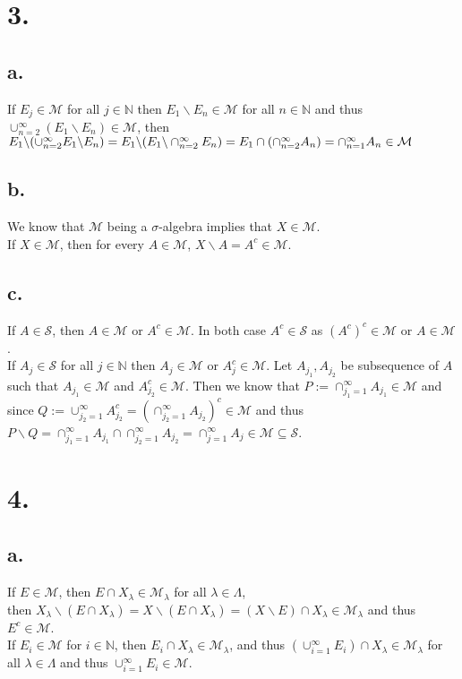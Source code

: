 \documentclass[11pt]{article}
\theoremstyle{mystyle}
\theoremstyle{definition}
\begin{document}
\section*{3.}
\subsection*{a.}
If $E_j \in \mathcal{M}$ for all $j \in \mathbb{N}$ then $E_1 \backslash E_n \in \mathcal{M}$ for all $n \in \mathbb{N}$ and thus $\cup_{n=2}^\infty (E_1 \backslash E_n) \in \mathcal{M}$, then $E_1 \backslash (\cup_{n=2}^\infty E_1 \backslash E_n) = E_1 \backslash (E_1 \backslash \cap_{n=2}^\infty E_n) =\\ E_1 \cap (\cap_{n=2}^\infty A_n) = \cap_{n=1}^\infty A_n \in \mathcal{M}$
\subsection*{b.}
We know that $\mathcal{M}$ being a $\sigma$-algebra implies that $X \in \mathcal{M}$. \\
If $X \in \mathcal{M}$, then for every $A \in \mathcal{M}$, $X \backslash A = A^c \in \mathcal{M}$. 
\subsection*{c.}
If $A \in \mathcal{S}$, then $A \in \mathcal{M}$ or $A^c \in \mathcal{M}$. In both case $A^c \in \mathcal{S}$ as $(A^c)^c \in \mathcal{M}$ or $A \in \mathcal{M}$. \\
If $A_j \in \mathcal{S}$ for all $j \in \mathbb{N}$ then $A_j \in \mathcal{M}$ or $A_j^c \in \mathcal{M}$. Let $A_{j_1}, A_{j_2}$ be subsequence of $A$ such that $A_{j_1} \in \mathcal{M}$ and $A_{j_2}^c \in \mathcal{M}$. Then we know that $P:= \cap_{j_1 = 1}^\infty A_{j_1} \in \mathcal{M}$ and since $Q := \cup_{j_2=1}^\infty A_{j_2}^c = (\cap_{j_2=1}^\infty A_{j_2})^c \in \mathcal{M}$ and thus $P\backslash Q = \cap_{j_1=1}^\infty A_{j_1} \cap \cap_{j_2=1}^\infty A_{j_2} = \cap_{j=1}^\infty A_j \in \mathcal{M} \subseteq \mathcal{S}$. 
\newpage
\section*{4.}
\subsection*{a.}
If $E \in \mathcal{M}$, then $E \cap X_\lambda \in \mathcal{M}_\lambda$ for all $\lambda \in \Lambda$, \\
then $X_\lambda \backslash (E \cap X_\lambda) = X\backslash (E \cap X_\lambda) = (X\backslash E)\cap X_\lambda  \in \mathcal{M}_\lambda$ and thus $E^c \in \mathcal{M}$. \\ 
If $E_i \in \mathcal{M}$ for $i \in \mathbb{N}$, then $E_i \cap X_\lambda \in \mathcal{M}_\lambda$, and thus $(\cup_{i=1}^\infty E_i )\cap X_\lambda \in \mathcal{M}_\lambda$ for all $\lambda \in \Lambda$ and thus $\cup_{i=1}^\infty E_i \in \mathcal{M}$. 
\end{document}
